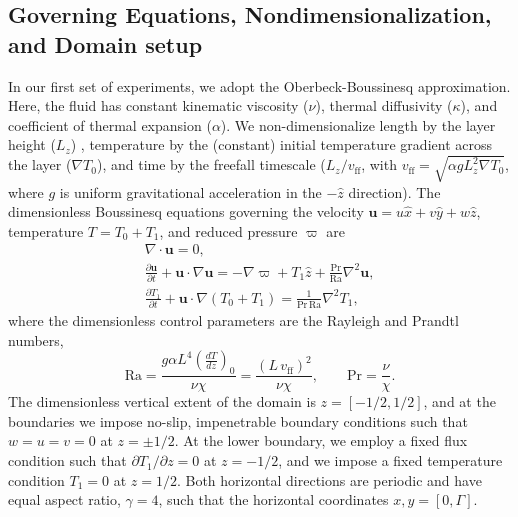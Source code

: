 \documentclass[aps, pre, onecolumn, nofootinbib, notitlepage, groupedaddress, amsfonts, amssymb, amsmath, longbibliography]{revtex4-1}
\newcommand{\DivU}{\ensuremath{\nabla\cdot\bm{u}}}
\newcommand{\grad}{\ensuremath{\nabla}}
\begin{document}
\subsection{Governing Equations, Nondimensionalization, and Domain setup}
In our first set of experiments, we adopt the Oberbeck-Boussinesq approximation.  Here, the
fluid has constant kinematic viscosity ($\nu$), thermal diffusivity ($\kappa$), and coefficient
of thermal expansion ($\alpha$).  We non-dimensionalize length by the layer height ($L_z$) ,
temperature by the (constant) initial temperature gradient across the layer ($\grad T_0$), and time
by the freefall timescale ($L_z / v_{\text{ff}}$, with $v_{\text{ff}} = \sqrt{\alpha g L_z^2 \grad T_0}$, where $g$ is 
uniform gravitational acceleration in the $-\hat{z}$ direction). The dimensionless Boussinesq
equations governing the velocity $\bm{u} = u\hat{x} + v\hat{y} + w\hat{z}$, temperature
$T = T_0 + T_1$, and reduced pressure $\varpi$ are \cite{spiegel&veronis1960}
\begin{gather}
\DivU = 0, 
	\label{eqn:incompressible}
\\
\frac{\partial \bm{u}}{\partial t} + \bm{u}\cdot\grad\bm{u} =
-\grad\varpi + T_1\hat{z} + \frac{\text{Pr}}{\text{Ra}}\grad^2\bm{u}, 
	\label{eqn:bouss_momentum}
\\
\frac{\partial T_1}{\partial t} + \bm{u}\cdot\grad(T_0 + T_1) = \frac{1}{\text{Pr}\,\text{Ra}}\grad^2 T_1,
	\label{eqn:bouss_energy}
\end{gather}
where the dimensionless control parameters are the Rayleigh and Prandtl numbers,
\begin{equation}
\text{Ra} = \frac{g \alpha L^4 \left(\frac{dT}{dz}\right)_0}{\nu\chi} = \frac{(L\,v_{\text{ff}})^2}{\nu\chi}, \qquad \text{Pr} = \frac{\nu}{\chi}.
\end{equation}
The dimensionless vertical extent of the domain is $z = [-1/2, 1/2]$, and at the boundaries
we impose no-slip, impenetrable boundary conditions such that $w = u = v = 0$ at $z = \pm 1/2$.
At the lower boundary, we employ a fixed flux condition such that $\partial T_1 / \partial z = 0$
at $z = -1/2$, and we impose a fixed temperature condition $T_1 = 0$ at $z = 1/2$. Both
horizontal directions are periodic and have equal aspect ratio, $\gamma = 4$, such that
the horizontal coordinates $x, y = [0, \Gamma]$.
\end{document}
